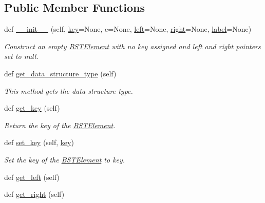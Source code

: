\subsection*{Public Member Functions}
\begin{DoxyCompactItemize}
\item 
def \mbox{\hyperlink{class_bridges_1_1_b_s_t_element_1_1_b_s_t_element_a029592a6643272b52a3095d4c963b2f4}{\+\_\+\+\_\+init\+\_\+\+\_\+}} (self, \mbox{\hyperlink{class_bridges_1_1_b_s_t_element_1_1_b_s_t_element_a2361f6985c8e968645c57ecdb837d000}{key}}=None, e=None, \mbox{\hyperlink{class_bridges_1_1_bin_tree_element_1_1_bin_tree_element_ae2011efda691620e8c76e366131b0195}{left}}=None, \mbox{\hyperlink{class_bridges_1_1_bin_tree_element_1_1_bin_tree_element_a5130987f56eff4edcc8c8ef323f8cd3d}{right}}=None, \mbox{\hyperlink{class_bridges_1_1_element_1_1_element_a301fe5be8cf72b2c62f6a218feeb9166}{label}}=None)
\begin{DoxyCompactList}\small\item\em Construct an empty \mbox{\hyperlink{class_bridges_1_1_b_s_t_element_1_1_b_s_t_element}{B\+S\+T\+Element}} with no key assigned and left and right pointers set to null. \end{DoxyCompactList}\item 
def \mbox{\hyperlink{class_bridges_1_1_b_s_t_element_1_1_b_s_t_element_a291061a5223baf43a84616d10a5cfd61}{get\+\_\+data\+\_\+structure\+\_\+type}} (self)
\begin{DoxyCompactList}\small\item\em This method gets the data structure type. \end{DoxyCompactList}\item 
def \mbox{\hyperlink{class_bridges_1_1_b_s_t_element_1_1_b_s_t_element_ad28d941484956bcae3b4bbfba2c8f8e4}{get\+\_\+key}} (self)
\begin{DoxyCompactList}\small\item\em Return the key of the \mbox{\hyperlink{class_bridges_1_1_b_s_t_element_1_1_b_s_t_element}{B\+S\+T\+Element}}. \end{DoxyCompactList}\item 
def \mbox{\hyperlink{class_bridges_1_1_b_s_t_element_1_1_b_s_t_element_a88a0a40bb39e33d5f7d7a75f5f498ea0}{set\+\_\+key}} (self, \mbox{\hyperlink{class_bridges_1_1_b_s_t_element_1_1_b_s_t_element_a2361f6985c8e968645c57ecdb837d000}{key}})
\begin{DoxyCompactList}\small\item\em Set the key of the \mbox{\hyperlink{class_bridges_1_1_b_s_t_element_1_1_b_s_t_element}{B\+S\+T\+Element}} to key. \end{DoxyCompactList}\item 
def \mbox{\hyperlink{class_bridges_1_1_b_s_t_element_1_1_b_s_t_element_aae6923e72c6bede9f8de54cab1104852}{get\+\_\+left}} (self)
\item 
def \mbox{\hyperlink{class_bridges_1_1_b_s_t_element_1_1_b_s_t_element_aa307077e096373b7ebf9ece22eb61c69}{get\+\_\+right}} (self)
\end{DoxyCompactItemize}
